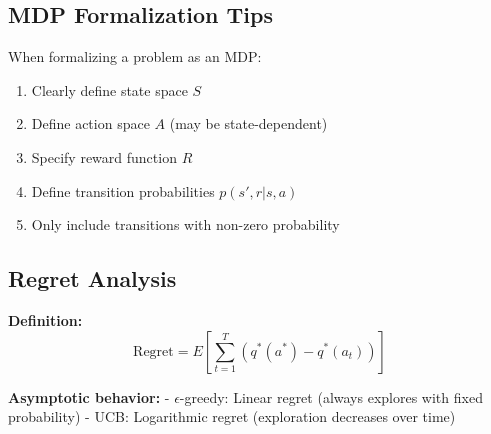 \documentclass[a4paper,11pt]{article}
\begin{document}
\subsection{MDP Formalization Tips}
When formalizing a problem as an MDP:
\begin{enumerate}
\item Clearly define state space $S$
\item Define action space $A$ (may be state-dependent)
\item Specify reward function $R$
\item Define transition probabilities $p(s',r|s,a)$
\item Only include transitions with non-zero probability
\end{enumerate}

\subsection{Regret Analysis}
\textbf{Definition:}
$$\text{Regret} = E\left[\sum_{t=1}^T (q^*(a^*) - q^*(a_t))\right]$$

\textbf{Asymptotic behavior:}
- $\epsilon$-greedy: Linear regret (always explores with fixed probability)
- UCB: Logarithmic regret (exploration decreases over time)
\end{document}
